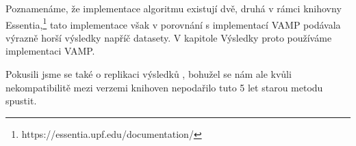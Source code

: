 Poznamenáme, že implementace algoritmu \cite{Salamon2012a} existují dvě, druhá v rámci knihovny Essentia,\footnote{https://essentia.upf.edu/documentation/} tato implementace však v porovnání s implementací VAMP podávala výrazně horší výsledky napříč datasety. V kapitole Výsledky proto používáme implementaci VAMP.

Pokusili jsme se také o replikaci výsledků \cite{Bosch2014}, bohužel se nám ale kvůli nekompatibilitě mezi verzemi knihoven nepodařilo tuto 5 let starou metodu spustit.


